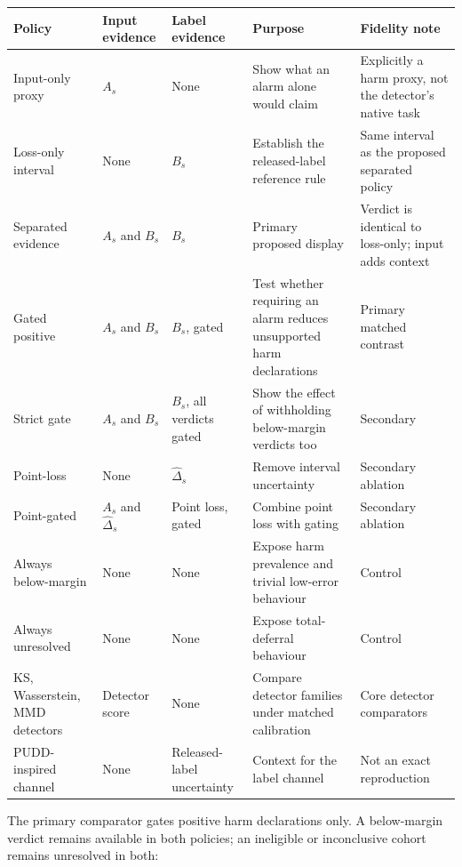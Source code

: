 \documentclass[
]{article}
\begin{document}
\begin{longtable}[]{@{}
  >{\raggedright\arraybackslash}p{}
  >{\raggedright\arraybackslash}p{}
  >{\raggedright\arraybackslash}p{}
  >{\raggedright\arraybackslash}p{}
  >{\raggedright\arraybackslash}p{}@{}}
\toprule
Policy & Input evidence & Label evidence & Purpose & Fidelity note \\
\midrule
\endhead
Input-only proxy & \(A_s\) & None & Show what an alarm alone would claim
& Explicitly a harm proxy, not the detector's native task \\
Loss-only interval & None & \(B_s\) & Establish the released-label
reference rule & Same interval as the proposed separated policy \\
Separated evidence & \(A_s\) and \(B_s\) & \(B_s\) & Primary proposed
display & Verdict is identical to loss-only; input adds context \\
Gated positive & \(A_s\) and \(B_s\) & \(B_s\), gated & Test whether
requiring an alarm reduces unsupported harm declarations & Primary
matched contrast \\
Strict gate & \(A_s\) and \(B_s\) & \(B_s\), all verdicts gated & Show
the effect of withholding below-margin verdicts too & Secondary \\
Point-loss & None & \(\widehat{\Delta}_s\) & Remove interval uncertainty
& Secondary ablation \\
Point-gated & \(A_s\) and \(\widehat{\Delta}_s\) & Point loss, gated &
Combine point loss with gating & Secondary ablation \\
Always below-margin & None & None & Expose harm prevalence and trivial
low-error behaviour & Control \\
Always unresolved & None & None & Expose total-deferral behaviour &
Control \\
KS, Wasserstein, MMD detectors & Detector score & None & Compare
detector families under matched calibration & Core detector
comparators \\
PUDD-inspired channel & None & Released-label uncertainty & Context for
the label channel & Not an exact reproduction \\
\bottomrule
\end{longtable}

The primary comparator gates positive harm declarations only. A
below-margin verdict remains available in both policies; an ineligible
or inconclusive cohort remains unresolved in both:
\end{document}
